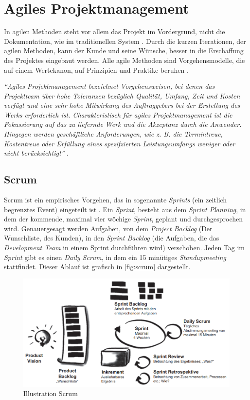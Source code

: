 \section{Agiles Projektmanagement}
\label{chapter:agil-pm}
In agilen Methoden steht vor allem das Projekt im Vordergrund, nicht die Dokumentation, wie im traditionellen System \cite{pm-agil-ursula}. Durch die kurzen Iterationen, der agilen Methoden, kann der Kunde und seine Wünsche, besser in die Erschaffung des Projektes eingebaut werden. Alle agile Methoden sind Vorgehensmodelle, die auf einem Wertekanon, auf Prinzipien und Praktike beruhen \cite{pm-agil-ursula}. 
\begin{center}
	\textit{\enquote{Agiles Projektmanagement bezeichnet Vorgehensweisen, 
			bei denen das Projektteam über hohe Toleranzen bezüglich Qualität, Umfang, Zeit und Kosten verfügt und eine sehr hohe Mitwirkung des Auftraggebers bei der Erstellung des Werks erforderlich ist. Charakteristisch für agiles Projektmanagement ist die Fokussierung auf das zu liefernde Werk und die Akzeptanz durch die Anwender. Hingegen werden geschäftliche Anforderungen, wie z. B. die Termintreue, Kostentreue oder Erfüllung eines spezifzierten Leistungsumfangs weniger oder nicht berücksichtigt}}  \cite{pm-agil-magazin}.
\end{center}
\subsection{Scrum}
Scrum ist ein empirisches Vorgehen, das in sogenannte \textit{Sprints} (ein zeitlich begrenztes Event) eingeteilt ist \cite{pm-agil-ursula}. Ein \textit{Sprint}, besteht aus dem \textit{Sprint Planning}, in dem der kommende, maximal vier wöchige \textit{Sprint}, geplant und durchgesprochen wird. Genauergesagt werden Aufgaben, von dem \textit{Project Backlog} (Der Wunschliste, des Kunden), in den \textit{Sprint Backlog} (die Aufgaben, die das \textit{Development Team} in einem Sprint durchführen wird) verschoben. Jeden Tag im \textit{Sprint} gibt es einen \textit{Daily Scrum}, in dem ein 15 minütiges \textit{Standupmeeting} stattfindet. Dieser Ablauf ist grafisch in \autoref{fig:scrum} dargestellt.
\begin{figure}[H]
	\centering
	\includegraphics[width=0.8\linewidth]{images/projektmanagement/scrum2}
	\caption[Scrum]{Illustration Scrum \cite{pm-agil-ursula}}
	\label{fig:scrum}
\end{figure}
